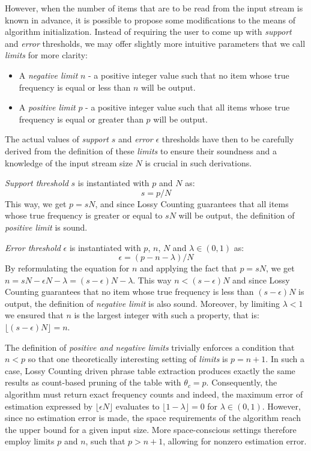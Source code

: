 However, when the number of items that are to be read from the input stream is known
in advance, it is possible to propose some modifications to the means of algorithm
initialization.
Instead of requiring the user to come up with \emph{support} and \emph{error} thresholds,
we may offer slightly more intuitive parameters that we call \emph{limits} for more clarity:
\begin{itemize}
  \item A \emph{negative limit} $n$ - a positive integer value such that no item
    whose true frequency is equal or less than $n$ will be output.
  \item A \emph{positive limit} $p$ - a positive integer value such that all items
    whose true frequency is equal or greater than $p$ will be output.
\end{itemize}

The actual values of \emph{support} $s$ and \emph{error} $\epsilon$ thresholds have then
to be carefully derived from the definition of these \emph{limits} to ensure their soundness and
a knowledge of the input stream size $N$ is crucial in such derivations.

\emph{Support threshold} $s$ is instantiated with $p$ and $N$ as:
\begin{equation}
  s = p / N
\end{equation}
This way, we get $p = sN$, and since Lossy Counting guarantees that all items whose true
frequency is greater or equal to $sN$ will be output, the definition of \emph{positive limit} is sound.

\emph{Error threshold} $\epsilon$ is instantiated with $p$, $n$, $N$ and $\lambda \in (0,1)$ as:
\begin{equation}
\label{eq:epsilon}
  \epsilon = (p - n - \lambda) / N
\end{equation}
By reformulating the equation for $n$ and applying the fact that $p = sN$,
we get $n = sN - \epsilon N - \lambda = (s - \epsilon)N - \lambda$.
This way $n < (s - \epsilon)N$ and since Lossy Counting guarantees that no item whose
true frequency is less than $(s - \epsilon)N$ is output, the definition of
\emph{negative limit} is also sound.
Moreover, by limiting $\lambda < 1$ we ensured that $n$ is the largest integer with such
a property, that is: $\lfloor (s - \epsilon)N \rfloor = n$.

The definition of \emph{positive and negative limits} trivially enforces a condition that $n < p$ so that
one theoretically interesting setting of \emph{limits} is $p = n + 1$.
In such a case, Lossy Counting driven phrase table extraction produces exactly the same
results as count-based pruning of the table with $\theta_{c} = p$.
Consequently, the algorithm must return exact frequency counts and indeed,
the maximum error of estimation expressed by $\lfloor \epsilon N\rfloor $ evaluates to
$\lfloor 1 - \lambda \rfloor = 0$ for $\lambda \in (0,1)$.
However, since no estimation error is made, the space requirements of the algorithm
reach the upper bound for a given input size.
More space-conscious settings therefore employ limits $p$ and $n$,
such that $p > n + 1$, allowing for nonzero estimation error.

